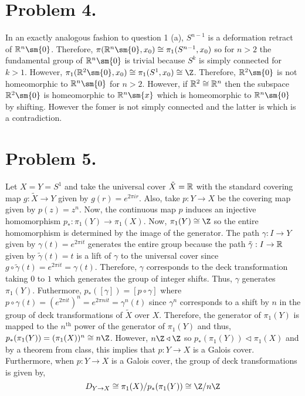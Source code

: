 \documentclass[12pt]{extarticle}
\begin{document}
\section*{Problem 4.}

In an exactly analogous fashion to question 1 (a), $S^{n - 1}$ is a deformation retract of $\R^n \sm \{0\}$. Therefore, $\pi(\R^n \sm \{0\}, x_0) \cong \pi_1(S^{n - 1}, x_0)$ so for $n > 2$ the fundamental group of $\R^n \sm \{0 \}$ is trivial because $S^{k}$ is simply connected for $k > 1$. However, $\pi_1(\R^2 \sm \{0 \}, x_0) \cong \pi_1(S^1, x_0) \cong \Z$. Therefore, $\R^2 \sm \{0 \}$ is not homeomorphic to $\R^n \sm \{0 \}$ for $n > 2$. However, if $\mathbb{R}^2 \cong \mathbb{R}^n$ then the subspace $\R^2 \sm \{0\}$ is homeomorphic to $\R^n \sm \{x\}$ which is homeomorphic to $\R^n \sm \{0\}$ by shifting. However the fomer is not simply connected and the latter is which is a contradiction. 

\section*{Problem 5.}

Let $X = Y = S^1$ and take the universal cover $\tilde{X} = \mathbb{R}$ with the standard covering map $g : \tilde{X} \to Y$ given by $g(r) = e^{2 \pi i r}$. Also, take $p : Y \to X$ be the covering map given by $p(z) = z^n$. Now, the continuous map $p$ induces an injective homomorphism $p_* : \pi_1(Y) \to \pi_1(X)$. Now, $\pi_1(Y) \cong \Z$ so the entire homomorphism is determined by the image of the generator. The path $\gamma : I \to Y$ given by $\gamma(t) = e^{2 \pi i t}$ generates the entire group because the path $\tilde{\gamma} : I \to \mathbb{R}$ given by $\tilde{\gamma}(t) = t$ is a lift of $\gamma$ to the universal cover since $g \circ \tilde{\gamma}(t) = e^{2 \pi i t} = \gamma(t)$. Therefore, $\gamma$ corresponds to the deck transformation taking $0$ to $1$ which generates the group of integer shifts. Thus, $\gamma$ generates $\pi_1(Y)$. Futhermore, $p_*([\gamma]) = [p \circ \gamma]$ where $p \circ \gamma(t) = (e^{2 \pi i t})^n = e^{2 \pi n i t} = \gamma^n(t)$ since $\gamma^n$ corresponds to a shift by $n$ in the group of deck transformations of $\tilde{X}$ over $X$. Therefore, the generator of $\pi_1(Y)$ is mapped to the $n^{\mathrm{th}}$ power of the generator of $\pi_1(Y)$ and thus, $p_*(\pi_1(Y)) = (\pi_1(X))^n \cong n \Z$. However, $n \Z \triangleleft \Z$ so $p_*(\pi_1(Y)) \triangleleft \pi_1(X)$ and by a theorem from class, this implies that $p : Y \to X$ is a Galois cover. Furthermore, when $p : Y \to X$ is a Galois cover, the group of deck transformations is given by, \[D_{Y \to X} \cong \pi_1(X) /p_*(\pi_1(Y)) \cong \Z/n\Z\]
\end{document}
